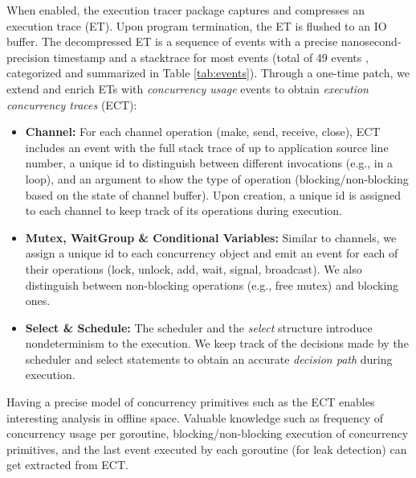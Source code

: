 When enabled, the execution tracer package captures and compresses an execution trace (ET).
%
Upon program termination, the ET is flushed to an IO buffer.
%
The decompressed ET is a sequence of events with a precise nanosecond-precision timestamp and a stacktrace for most events (total of 49 events \cite{goParserSource}, categorized and summarized in Table \ref{tab:events}).
%
Through a one-time patch, we extend and enrich ETs with \textit{concurrency usage} events to obtain \textit{execution concurrency traces} (ECT):
\begin{itemize}
    \item \textbf{Channel:} For each channel operation (make, send, receive, close), ECT includes an event with the full stack trace of up to application source line number, a unique id to distinguish between different invocations (e.g., in a loop), and an argument to show the type of operation (blocking/non-blocking based on the state of channel buffer). Upon creation, a unique id is assigned to each channel to keep track of its operations during execution.
    \item \textbf{Mutex, WaitGroup \& Conditional Variables:} Similar to channels, we assign a unique id to each concurrency object and emit an event for each of their operations (lock, unlock, add, wait, signal, broadcast). We also distinguish between non-blocking operations (e.g., free mutex) and blocking ones.
    \item \textbf{Select \& Schedule:} The scheduler and the \textit{select} structure introduce nondeterminism to the execution. We keep track of the decisions made by the scheduler and select statements to obtain an accurate \textit{decision path} during execution.
\end{itemize}

Having a precise model of concurrency primitives such as the ECT enables interesting analysis in offline space.
%
Valuable knowledge such as frequency of concurrency usage per goroutine, blocking/non-blocking execution of concurrency primitives, and the last event executed by each goroutine (for leak detection) can get extracted from ECT.


